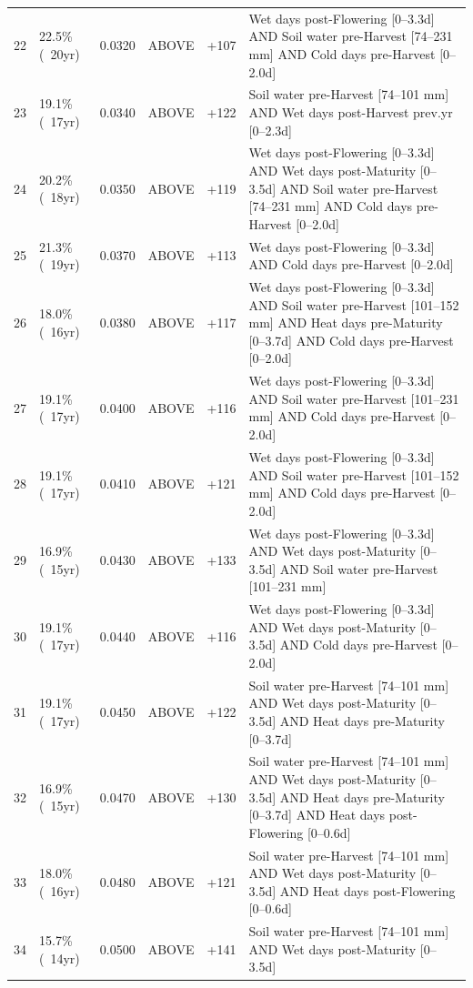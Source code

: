 {\begin{longtable}{p{0.4cm}|p{1.5cm}|p{1.2cm}|p{1.3cm}|p{1.5cm}|p{8.2cm}}
  22 & 22.5\% (~20yr) & 0.0320 & ABOVE & +107 & Wet days post-Flowering [0--3.3d] AND Soil water pre-Harvest [74--231 mm] AND Cold days pre-Harvest [0--2.0d] \\
  23 & 19.1\% (~17yr) & 0.0340 & ABOVE & +122 & Soil water pre-Harvest [74--101 mm] AND Wet days post-Harvest prev.yr [0--2.3d] \\
  24 & 20.2\% (~18yr) & 0.0350 & ABOVE & +119 & Wet days post-Flowering [0--3.3d] AND Wet days post-Maturity [0--3.5d] AND Soil water pre-Harvest [74--231 mm] AND Cold days pre-Harvest [0--2.0d] \\
  25 & 21.3\% (~19yr) & 0.0370 & ABOVE & +113 & Wet days post-Flowering [0--3.3d] AND Cold days pre-Harvest [0--2.0d] \\
  26 & 18.0\% (~16yr) & 0.0380 & ABOVE & +117 & Wet days post-Flowering [0--3.3d] AND Soil water pre-Harvest [101--152 mm] AND Heat days pre-Maturity [0--3.7d] AND Cold days pre-Harvest [0--2.0d] \\
  27 & 19.1\% (~17yr) & 0.0400 & ABOVE & +116 & Wet days post-Flowering [0--3.3d] AND Soil water pre-Harvest [101--231 mm] AND Cold days pre-Harvest [0--2.0d] \\
  28 & 19.1\% (~17yr) & 0.0410 & ABOVE & +121 & Wet days post-Flowering [0--3.3d] AND Soil water pre-Harvest [101--152 mm] AND Cold days pre-Harvest [0--2.0d] \\
  29 & 16.9\% (~15yr) & 0.0430 & ABOVE & +133 & Wet days post-Flowering [0--3.3d] AND Wet days post-Maturity [0--3.5d] AND Soil water pre-Harvest [101--231 mm] \\
  30 & 19.1\% (~17yr) & 0.0440 & ABOVE & +116 & Wet days post-Flowering [0--3.3d] AND Wet days post-Maturity [0--3.5d] AND Cold days pre-Harvest [0--2.0d] \\
  31 & 19.1\% (~17yr) & 0.0450 & ABOVE & +122 & Soil water pre-Harvest [74--101 mm] AND Wet days post-Maturity [0--3.5d] AND Heat days pre-Maturity [0--3.7d] \\
  32 & 16.9\% (~15yr) & 0.0470 & ABOVE & +130 & Soil water pre-Harvest [74--101 mm] AND Wet days post-Maturity [0--3.5d] AND Heat days pre-Maturity [0--3.7d] AND Heat days post-Flowering [0--0.6d] \\
  33 & 18.0\% (~16yr) & 0.0480 & ABOVE & +121 & Soil water pre-Harvest [74--101 mm] AND Wet days post-Maturity [0--3.5d] AND Heat days post-Flowering [0--0.6d] \\
  34 & 15.7\% (~14yr) & 0.0500 & ABOVE & +141 & Soil water pre-Harvest [74--101 mm] AND Wet days post-Maturity [0--3.5d] \\

\end{longtable}}
